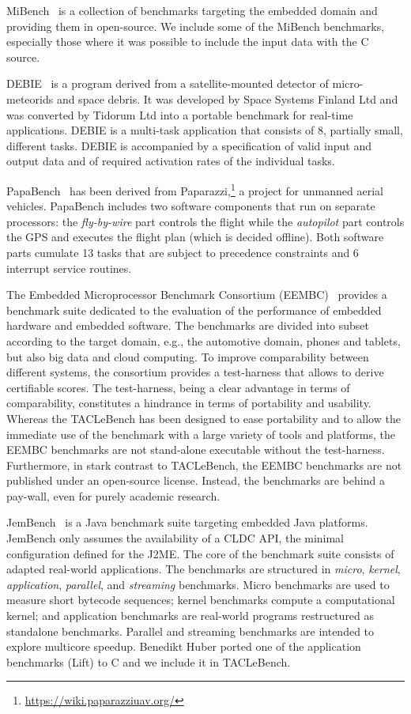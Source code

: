 \documentclass[a4paper,UKenglish]{oasics}
\newcommand{\martin}[1]{{\color{blue} Martin: #1}}
\begin{document}
MiBench~\cite{MiBench} is a collection of benchmarks targeting the embedded
domain and providing them in open-source.
We include some of the MiBench benchmarks, especially
those where it was possible to include the input data with the C source.

DEBIE~\cite{debie} is a program derived from a satellite-mounted detector of micro-meteorids and space debris.
It was developed by Space Systems Finland Ltd and was converted by Tidorum Ltd into a portable benchmark for real-time applications.
DEBIE is a multi-task application that consists of 8, partially small, different tasks.
DEBIE is accompanied by a specification of valid input and output data and of required activation rates of the individual tasks.

PapaBench~\cite{papabench} has been derived from  Paparazzi,\footnote{\url{https://wiki.paparazziuav.org/}}
a project for unmanned aerial vehicles.  PapaBench includes
two software components that run on separate processors:
the \textit{fly-by-wire} part controls the flight while the \textit{autopilot} part controls the GPS and
executes the flight plan (which is decided offline). Both software parts  cumulate 13 tasks that are subject
to precedence constraints and 6 interrupt service routines.

The Embedded Microprocessor Benchmark Consortium (EEMBC)~\cite{eembc} provides a
benchmark suite dedicated to the evaluation of
the performance of embedded hardware and embedded software.
The benchmarks are divided into subset according to the target domain, e.g., the automotive domain, phones and tablets, but also big data and cloud computing.
To improve comparability between different systems, the consortium provides a
test-harness that allows to derive certifiable scores.
The test-harness, being a clear advantage in terms of comparability,
constitutes a hindrance in terms of portability and usability.
Whereas the TACLeBench has been designed to ease portability and to allow the immediate use of the benchmark with a large variety of tools and platforms, the EEMBC benchmarks are not stand-alone executable without the test-harness.
Furthermore, in stark contrast to TACLeBench, the EEMBC benchmarks are not published under an open-source license.
Instead, the benchmarks are behind a pay-wall, even for purely academic research.


JemBench~\cite{jembench} is a Java benchmark suite targeting
embedded Java platforms. JemBench only assumes the
availability of a CLDC API, the minimal configuration
defined for the J2ME. The core of the benchmark suite consists of
adapted real-world applications.
The benchmarks are structured in {\em micro}, {\em kernel}, {\em
application}, {\em parallel}, and {\em streaming} benchmarks.
Micro benchmarks are used to measure short bytecode sequences;
kernel benchmarks compute a computational kernel; and application
benchmarks are real-world programs restructured as standalone benchmarks.
Parallel and streaming benchmarks are intended to explore multicore
speedup.
Benedikt Huber ported one of the application benchmarks (Lift) to C
and we include it in TACLeBench.
\end{document}
